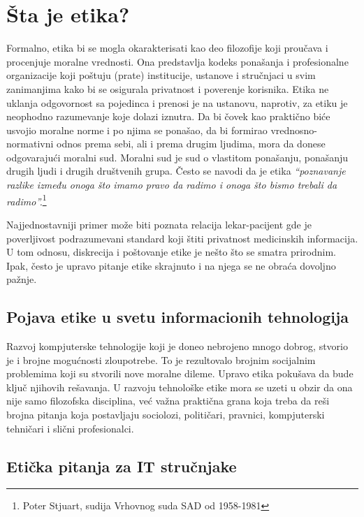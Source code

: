 \documentclass[a4paper]{article}
\begin{document}
{\section{Šta je etika?}

Formalno, etika bi se mogla okarakterisati kao deo filozofije koji pro\-u\-ča\-va i procenjuje moralne vrednosti. Ona predstavlja kodeks ponašanja i profesionalne organizacije koji poštuju (prate) institucije, ustanove i stručnjaci u svim zanimanjima kako bi se osigurala privatnost i poverenje korisnika. Etika ne uklanja odgovornost sa pojedinca i prenosi je na ustanovu, naprotiv, za etiku je neophodno razumevanje koje dolazi iznutra. Da bi čovek kao praktično biće usvojio moralne norme i po njima se ponašao, da bi formirao vrednosno-normativni odnos prema sebi, ali i prema drugim ljudima, mora da donese odgovarajući moralni sud. Moralni sud je sud o vlastitom ponašanju, ponašanju drugih ljudi i drugih društvenih grupa.\cite{Tavani}\cite{Illinois}
Često se navodi da je etika \emph{“poznavanje razlike između onoga što imamo pravo da radimo i onoga što bismo trebali da radimo”.}\footnote{Poter Stjuart, sudija Vrhovnog suda SAD od 1958-1981}

Najjednostavniji primer može biti poznata relacija lekar-pacijent gde je poverljivost podrazumevani standard koji štiti privatnost medicinskih informacija. U tom odnosu, diskrecija i poštovanje etike je nešto što se smatra prirodnim. Ipak, često je upravo pitanje etike skrajnuto i na njega se ne obraća dovoljno pažnje.

\subsection{Pojava etike u svetu informacionih tehnologija}

Razvoj kompjuterske tehnologije koji je doneo nebrojeno mnogo dobrog, stvorio je i brojne mogućnosti zloupotrebe. To je rezultovalo brojnim socijalnim problemima koji su stvorili nove moralne dileme. Upravo  etika pokušava da bude ključ njihovih rešavanja. U razvoju tehnološke etike mora se uzeti u obzir da ona nije samo filozofska disciplina, već važna praktična grana koja treba da reši brojna pitanja koja postavljaju sociolozi, političari, pravnici, kompjuterski tehničari i slični profesionalci\cite{Illinois}.

\subsection{Etička pitanja za IT stručnjake}

}
\end{document}
